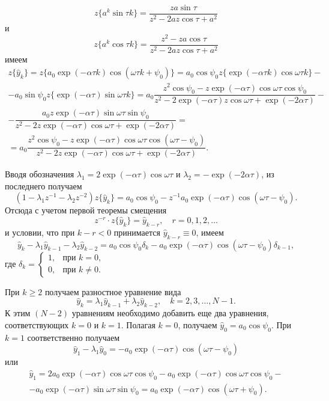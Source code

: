 $$
z\{a^k\sin \tau k\}= \dfrac{z a\sin \tau}{z^2 - 2 a z \cos\tau + a^2}
$$
и
$$
z\{a^k\cos\tau k\}=\dfrac{z^2-z a \cos \tau}{z^2 - 2 a z \cos \tau +a^2}
$$
имеем
\begin{multline*}
z\{\hat{y}_k\}=z\{a_0\exp(-\alpha\tau k)\cos(\omega\tau k +\psi_0)\}=a_0\cos\psi_0z\{\exp(-\alpha \tau k)\cos\omega \tau k\}-\\
-a_0\sin\psi_0z\{\exp(-\alpha\tau)\sin\omega\tau k\}=a_0\dfrac{z^2\cos\psi_0-z\exp(-\alpha\tau)\cos\omega\tau\cos\psi_0}{z^2-2\exp(-\alpha\tau)z\cos\omega\tau+\exp(-2\alpha\tau)}-\\
-\dfrac{a_0z\exp(-\alpha\tau)\sin\omega\tau\sin\psi_0}{z^2-2z\exp(-\alpha\tau)\cos\omega\tau+\exp(-2\alpha\tau)}=\\
=a_0\dfrac{z^2\cos\psi_0-z\exp(-\alpha\tau)\cos\omega\tau\cos(\omega\tau-\psi_0)}{z^2-2z\exp(-\alpha\tau)\cos\omega\tau+\exp(-2\alpha\tau)}.
\end{multline*}
	
Вводя обозначения $\lambda_1=2\exp(-\alpha\tau)\cos\omega\tau$ и $\lambda_2=-\exp(-2\alpha\tau)$, из последнего получаем
$$
(1-\lambda_1z^{-1}-\lambda_2 z^{-2})z\{\hat{y}_k\}=a_0\cos\psi_0-z^{-1}a_0\exp(-\alpha\tau)\cos(\omega\tau-\psi_0).
$$
Отсюда с учетом первой теоремы смещения~\cite{zot:12} 
$$z^{-r} \cdot z\{\hat{y}_k\}=\hat{y}_{k-r},\quad  r=0,1,2,\dots 
$$ 
и условии, что при $k-r<0$ принимается $\hat{y}_{k-r}\equiv 0$,  имеем
$$
\hat{y}_k-\lambda_1\hat{y}_{k-1}-\lambda_2\hat{y}_{k-2}=a_0\cos\psi_0\delta_k-a_0\exp(-\alpha\tau)\cos(\omega\tau-\psi_0)\delta_{k-1},
$$
где $\delta_k=\begin{cases}
1, & \text{при $k=0$,} \\
0, & \text{при $k \neq 0$.}
\end{cases}$

При $k\geq 2$ получаем разностное уравнение вида 
$$\hat{y}_k=\lambda_1\hat{y}_{k-1}+\lambda_2\hat{y}_{k-2},\quad  k=2,3,\dots,N-1.$$ 
К этим $(N-2)$ уравнениям необходимо добавить еще два уравнения, соответствующих $k=0$ и $k=1$. 
Полагая $k=0$, получаем $\hat{y}_0=a_0\cos\psi_0$. 
При $k=1$ соответственно получаем
$$\hat{y}_1-\lambda_1\hat{y}_0=-a_0\exp(-\alpha\tau)\cos(\omega\tau-\psi_0)$$
или
\begin{multline*}
\hat{y}_1=2a_0\exp(-\alpha\tau)\cos\omega\tau\cos\psi_0-a_0\exp(-\alpha\tau)\cos\omega\tau\cos\psi_0-\\
-a_0\exp(-\alpha\tau)\sin\omega\tau\sin\psi_0=a_0\exp(-\alpha\tau)\cos(\omega\tau+\psi_0).
\end{multline*}


